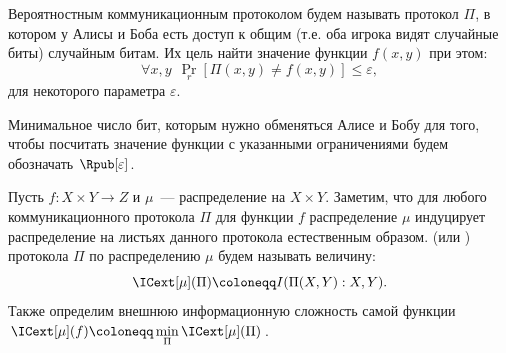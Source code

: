 






\begin{definition*}
     Вероятностным коммуникационным протоколом будем называть протокол $\Pi$, в
    котором у Алисы и Боба есть доступ к общим (т.е. оба игрока видят случайные биты) случайным битам. Их
    цель найти значение функции $f(x, y)$ при этом:
    $$
        \forall x, y ~~ \Pr\limits_{r}[\Pi(x, y) \neq f(x, y)] \le \varepsilon,
    $$
    для некоторого параметра $\varepsilon$.

    Минимальное число бит, которым нужно обменяться Алисе и Бобу для того, чтобы посчитать значение
    функции с указанными ограничениями будем обозначать $\Rpub[\varepsilon]$.
\end{definition*}


\begin{definition*}
    Пусть $f\colon X \times Y \to Z$ и $\mu$~--- распределение на $X \times Y$. Заметим, что для любого
    коммуникационного протокола $\Pi$ для функции $f$ распределение $\mu$ индуцирует распределение на
    листьях данного протокола естественным образом.  (или
    ) протокола $\Pi$ по распределению $\mu$ будем называть
    величину:
    $$\ICext[\mu](\Pi) \coloneqq I(\Pi(X, Y) : X, Y).$$
    Также определим внешнюю информационную сложность самой функции
    $\ICext[\mu](f) \coloneqq \min\limits_{\Pi} \ICext[\mu](\Pi)$.
\end{definition*}

